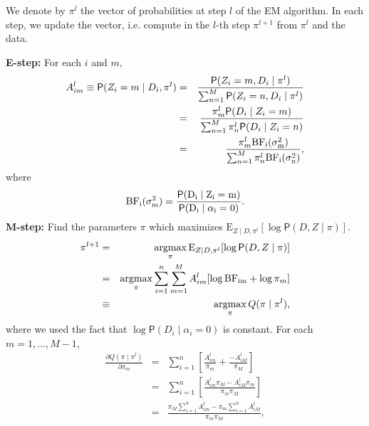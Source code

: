 \documentclass[12pt,letterpaper]{article}
\renewcommand{\Pr}{\mathsf{P}}
\newcommand{\given}{\mid}
\newcommand{\mean}{\mathrm{E}}
\newcommand{\argmax}{\operatornamewithlimits{argmax}}
\newcommand{\nin}{\noindent}
\def\BF{\rm BF}
\newcommand{\zuk}[1]{\textcolor{red}{[#1 --Or]}}
\newcommand{\heejung}[1]{\textcolor{blue}{[#1 --Heejung]}}
\begin{document}
We denote by $\pi^{l}$ the vector of probabilities at step $l$ of the EM algorithm. In each step, we update the vector, i.e.
compute in the $l$-th step $\pi^{l+1}$ from $\pi^l$ and the data.

{\bf E-step:} For each $i$ and $m$,
\begin{eqnarray}
A_{im}^l \equiv \Pr(Z_i = m \given D_i, \pi^l) &=& \frac{\Pr(Z_i = m, D_i \given \pi^l)}{\sum_{n=1}^M\Pr(Z_i = n, D_i \given \pi^l)} \\
&=& \frac{\pi_m^l\Pr(D_i \given Z_i = m)}{\sum_{n=1}^M\pi_n^l\Pr(D_i \given Z_i = n)} \\
&=& \frac{\pi_m^l\BF_i(\sigma^2_m)}{\sum_{n=1}^M\pi_n^l\BF_i(\sigma^2_n)},
\end{eqnarray}
where
\begin{eqnarray}
\label{eq:base_factor}
\BF_i(\sigma^2_m) =  \frac{\Pr(D_i \given Z_i = m)}{\Pr(D_i \given \alpha_i = 0)}.
\end{eqnarray}
{\bf M-step:} Find the parameters $\pi$ which maximizes $\mean_{Z \given D, \pi^l}[\log\Pr(D, Z \given \pi)]$.
\begin{eqnarray}
\pi^{l+1} &=& \argmax_{\pi}\mean_{Z \given D, \pi^l}[\log\Pr(D, Z \given \pi)]\\
	       &=& \argmax_{\pi} \sum_{i=1}^{n} \sum_{m=1}^M A_{im}^l[\log{\BF_{im}} + \log{\pi_m}]\\
	       &\equiv& \argmax_{\pi} Q(\pi \given \pi^l),
\end{eqnarray}
\nin where we used the fact that $\log \Pr(D_i \given \alpha_i=0)$ is constant.
For each $m = 1, \ldots, M-1$,
\begin{eqnarray}
\frac{\partial Q(\pi \given \pi^l)}{\partial \pi_m} &=& \sum_{i=1}^n[\frac{A_{im}^l}{\pi_m} + \frac{-A_{iM}^l}{\pi_M}]\\
			&=& \sum_{i=1}^n[\frac{A_{im}^l\pi_M -A_{iM}^l\pi_m}{\pi_m\pi_M}]\\
			&=& \frac{\pi_M \sum_{i=1}^nA_{im}^l -\pi_m \sum_{i=1}^nA_{iM}^l}{\pi_m\pi_M},
\end{eqnarray}
\end{document}

